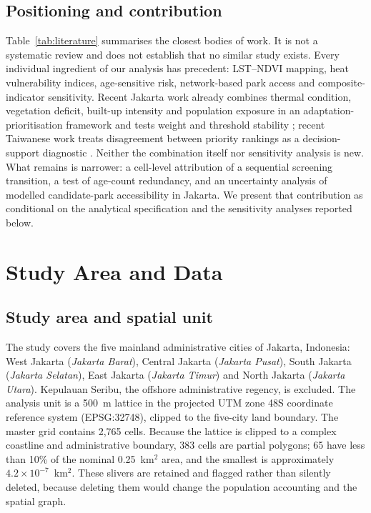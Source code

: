\documentclass[times,twoside]{_Templates/MultiTargetManuscript}
\begin{document}
\subsection{Positioning and contribution}

Table~\ref{tab:literature} summarises the closest bodies of work. It is not a
systematic review and does not establish that no similar study exists. Every
individual ingredient of our analysis has precedent: LST--NDVI mapping, heat
vulnerability indices, age-sensitive risk, network-based park access and
composite-indicator sensitivity. Recent Jakarta work already combines thermal
condition, vegetation deficit, built-up intensity and population exposure in an
adaptation-prioritisation framework and tests weight and threshold stability
\citep{perdinan2026}; recent Taiwanese work treats disagreement between
priority rankings as a decision-support diagnostic \citep{fitria2026}. Neither
the combination itself nor sensitivity analysis is new. What remains is
narrower: a cell-level attribution of
a sequential screening transition, a test of age-count redundancy, and an
uncertainty analysis of modelled candidate-park accessibility in Jakarta. We
present that contribution as conditional on the analytical specification and
the sensitivity analyses reported below.



\section{Study Area and Data}

\subsection{Study area and spatial unit}

The study covers the five mainland administrative cities of Jakarta, Indonesia:
West Jakarta (\textit{Jakarta Barat}), Central Jakarta (\textit{Jakarta Pusat}),
South Jakarta (\textit{Jakarta Selatan}), East Jakarta (\textit{Jakarta Timur})
and North Jakarta (\textit{Jakarta Utara}). Kepulauan Seribu, the offshore
administrative regency, is excluded. The analysis unit is a 500~m lattice in the
projected UTM zone 48S coordinate reference system (EPSG:32748), clipped to the
five-city land boundary. The master grid contains 2,765 cells. Because the
lattice is clipped to a complex coastline and administrative boundary, 383 cells
are partial polygons; 65 have less than 10\% of the nominal 0.25~km$^2$ area, and
the smallest is approximately $4.2\times10^{-7}$~km$^2$. These slivers are
retained and flagged rather than silently deleted, because deleting them would
change the population accounting and the spatial graph.
\end{document}
